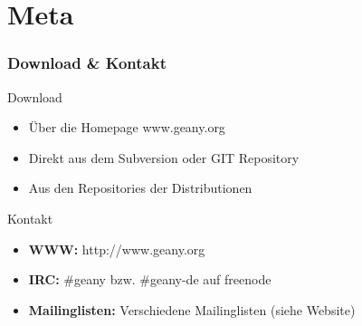 \section{Meta}
\begin{frame}
	\frametitle{Download \& Kontakt}
	\begin{block}{Download}
		\begin{itemize}
			\item Über die Homepage www.geany.org
			\item Direkt aus dem Subversion oder GIT Repository
			\item Aus den Repositories der Distributionen
		\end{itemize}
	\end{block}
	\begin{block}{Kontakt}
		\begin{itemize}
			\item \textbf{WWW:} http://www.geany.org
			\item \textbf{IRC:} \#geany bzw. \#geany-de auf freenode
			\item \textbf{Mailinglisten:} Verschiedene Mailinglisten (siehe Website)
		\end{itemize}
	\end{block}
\end{frame}
